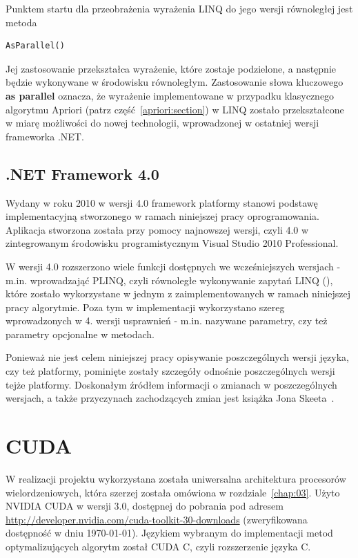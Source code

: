 Punktem startu dla przeobrażenia wyrażenia LINQ do jego wersji równoległej jest metoda 

\begin{verbatim}
AsParallel()
\end{verbatim}

Jej zastosowanie przekształca wyrażenie, które zostaje podzielone, a następnie będzie wykonywane w środowisku równoległym. Zastosowanie słowa kluczowego \textbf{as parallel} oznacza, że wyrażenie implementowane w przypadku klasycznego algorytmu Apriori (patrz część~\ref{apriori:section}) w LINQ zostało przekształcone w miarę możliwości do nowej technologii, wprowadzonej w ostatniej wersji frameworka .NET.

\subsection{.NET Framework 4.0}
Wydany w roku 2010 w wersji 4.0 framework platformy stanowi podstawę implementacyjną stworzonego w ramach niniejszej pracy oprogramowania. Aplikacja stworzona została przy pomocy najnowszej wersji, czyli 4.0 w zintegrowanym środowisku programistycznym Visual Studio 2010 Professional. 

W wersji 4.0 rozszerzono wiele funkcji dostępnych we wcześniejszych wersjach - m.in. wprowadzająć PLINQ, czyli równoległe wykonywanie zapytań LINQ (), które zostało wykorzystane w jednym z zaimplementowanych w ramach niniejszej pracy algorytmie. Poza tym w implementacji wykorzystano szereg wprowadzonych w 4. wersji usprawnień - m.in. nazywane parametry, czy też parametry opcjonalne w metodach. 

Ponieważ nie jest celem niniejszej pracy opisywanie poszczególnych wersji języka, czy też platformy, pominięte zostały szczegóły odnośnie poszczególnych wersji tejże platformy. Doskonałym źródłem informacji o zmianach w poszczególnych wersjach, a także przyczynach zachodzących zmian jest książka Jona Skeeta~\cite{cSharp:inDepthS}.

\section{CUDA}
W realizacji projektu wykorzystana została uniwersalna architektura procesorów wielordzeniowych, która szerzej została omówiona w rozdziale~\ref{chap:03}. Użyto NVIDIA CUDA w wersji 3.0, dostępnej do pobrania pod adresem \url{http://developer.nvidia.com/cuda-toolkit-30-downloads} (zweryfikowana dostępność w dniu \today). Językiem wybranym do implementacji metod optymalizujących algorytm został CUDA C, czyli rozszerzenie języka C.

